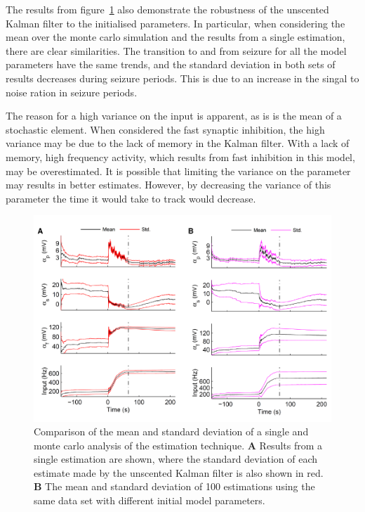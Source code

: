 The results from figure~\ref{fig: MonteResults} also demonstrate the robustness of the unscented Kalman filter to the initialised parameters. In particular, when considering the mean over the monte carlo simulation and the results from a single estimation, there are clear similarities. The transition to and from seizure for all the model parameters have the same trends, and the standard deviation in both sets of results decreases during seizure periods. This is due to an increase in the singal to noise ration in seizure periods. 

The reason for a high variance on the input is apparent, as is is the mean of a stochastic element. When considered the fast synaptic inhibition, the high variance may be due to the lack of memory in the Kalman filter. With a lack of memory, high frequency activity, which results from fast inhibition in this model, may be overestimated. It is possible that limiting the variance on the parameter may results in better estimates. However, by decreasing the variance of this parameter the time it would take to track would decrease.

\begin{figure}[ht]
	\centering
		\includegraphics{fig/MonteResults.pdf}
	\caption{Comparison of the mean and standard deviation of a single and monte carlo analysis of the estimation technique. \textbf{A} Results from a single estimation are shown, where the standard deviation of each estimate made by the unscented Kalman filter is also shown in red. \textbf{B} The mean and standard deviation of 100 estimations using the same data set with different initial model parameters.}
	\label{fig: MonteResults}
\end{figure}
 